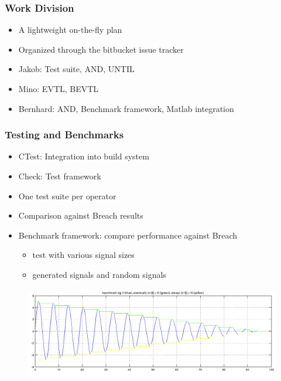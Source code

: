 \documentclass{beamer}
\begin{document}
\begin{frame}
\frametitle{Work Division}
\begin{itemize}
\item A lightweight on-the-fly plan
\item Organized through the bitbucket issue tracker
\item Jakob: Test suite, AND, UNTIL
\item Mino: EVTL, BEVTL
\item Bernhard: AND, Benchmark framework, Matlab integration
\end{itemize}
\end{frame}

\begin{frame}
\frametitle{Testing and Benchmarks}
\begin{itemize}
\item CTest: Integration into build system
\item Check: Test framework
\item One test suite per operator
\item Comparison against Breach results
\item Benchmark framework: compare performance against Breach
\begin{itemize}
	\item test with various signal sizes
	\item generated signals and random signals
\end{itemize}
\end{itemize}
\begin{figure}[H]
    \includegraphics[scale=0.3]{bm_sig3_ev_alw.png}
\end{figure}
\end{frame}
\end{document}
